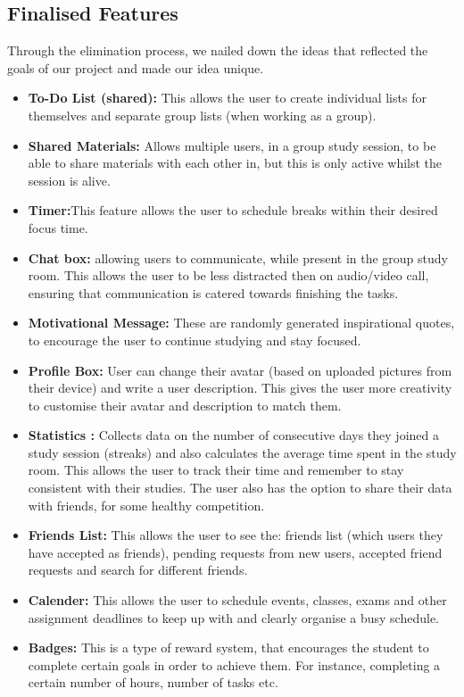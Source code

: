 \subsection{Finalised Features} Through the elimination process, we nailed down the ideas that reflected the goals of our project and made our idea unique. 
\begin{itemize}
    \item \textbf{To-Do List (shared):} This allows the user to create individual lists for themselves and separate group lists (when working as a group). 
    \item \textbf{Shared Materials:} Allows multiple users, in a group study session, to be able to share materials with each other in, but this is only active whilst the session is alive.
    \item \textbf{Timer:}This feature allows the user to schedule breaks within their desired focus time.
    \item \textbf{Chat box:} allowing users to communicate, while present in the group study room. This allows the user to be less distracted then on audio/video call, ensuring that communication is catered towards finishing the tasks.
    \item \textbf{Motivational Message:} These are randomly generated inspirational quotes, to encourage the user to continue studying and stay focused.
    \item \textbf{Profile Box:}  User can change their avatar (based on uploaded pictures from their device) and write a user description. This gives the user more creativity to customise their avatar and description to match them.
    \item \textbf{Statistics :} Collects data on the number of consecutive days they joined a study session (streaks) and also calculates the average time spent in the study room. This allows the user to track their time and remember to stay consistent with their studies. The user also has the option to share their data with friends, for some healthy competition. 
    \item \textbf{Friends List:} This allows the user to see the: friends list (which users they have accepted as friends), pending requests from new users, accepted friend requests and search for different friends. 
    \item \textbf{Calender:} This allows the user to schedule events, classes, exams and other assignment deadlines to keep up with and clearly organise a busy schedule.
    \item \textbf{Badges:} This is a type of reward system, that encourages the student to complete certain goals in order to achieve them. For instance, completing a certain number of hours, number of tasks etc.

\end{itemize}
